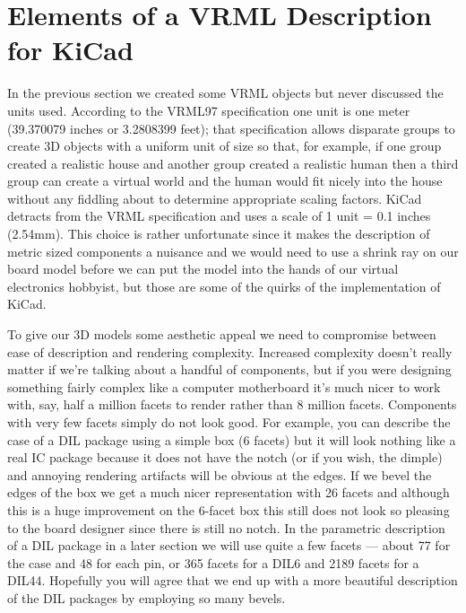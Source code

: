 \documentclass[a4paper]{article}
\begin{document}
\section{Elements of a VRML Description for KiCad}
In the previous section we created some VRML objects but never discussed the units used. According to the VRML97
specification one unit is one meter (39.370079 inches or 3.2808399 feet); that specification allows disparate
groups to create 3D objects with a uniform unit of size so that, for example, if one group created a realistic
house and another group created a realistic human then a third group can create a virtual world and the human
would fit nicely into the house without any fiddling about to determine appropriate scaling factors. KiCad
detracts from the VRML specification and uses a scale of 1 unit = 0.1 inches (2.54mm). This choice is rather
unfortunate since it makes the description of metric sized components a nuisance and we would need to use a
shrink ray on our board model before we can put the model into the hands of our virtual electronics hobbyist,
but those are some of the quirks of the implementation of KiCad.

To give our 3D models some aesthetic appeal we need to compromise between ease of description and rendering
complexity.  Increased complexity doesn't really matter if we're talking about a handful of components, but if you
were designing something fairly complex like a computer motherboard it's much nicer to work with, say, half a million
facets to render rather than 8 million facets. Components with very few facets simply do not look good. For example, you
can describe the case of a DIL package using a simple box (6 facets) but it will look nothing like a real
IC package because it does not have the notch (or if you wish, the dimple) and annoying rendering artifacts
will be obvious at the edges. If we bevel the edges of the box we get a much nicer representation with 26 facets
and although this is a huge improvement on the 6-facet box this still does not look so pleasing to the
board designer since there is still no notch. In the parametric description of a DIL package in a later section
we will use quite a few facets --- about 77 for the case and 48 for each pin, or 365 facets for a DIL6 and
2189 facets for a DIL44. Hopefully you will agree that we end up with a more beautiful description of the DIL packages
by employing so many bevels.
\end{document}
